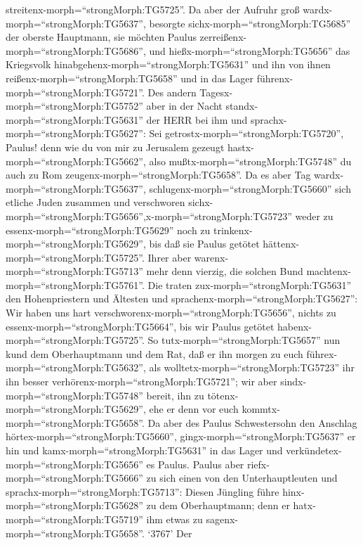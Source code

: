 streitenx-morph=``strongMorph:TG5725''.  Da aber der
Aufruhr groß wardx-morph=``strongMorph:TG5637'', besorgte
sichx-morph=``strongMorph:TG5685'' der oberste Hauptmann, sie möchten
Paulus zerreißenx-morph=``strongMorph:TG5686'', und
hießx-morph=``strongMorph:TG5656'' das Kriegsvolk
hinabgehenx-morph=``strongMorph:TG5631'' und ihn von ihnen
reißenx-morph=``strongMorph:TG5658'' und in das Lager
führenx-morph=``strongMorph:TG5721''.  Des andern
Tagesx-morph=``strongMorph:TG5752'' aber in der Nacht
standx-morph=``strongMorph:TG5631'' der HERR bei ihm und
sprachx-morph=``strongMorph:TG5627'': Sei
getrostx-morph=``strongMorph:TG5720'', Paulus! denn wie du von mir zu
Jerusalem gezeugt hastx-morph=``strongMorph:TG5662'', also
mußtx-morph=``strongMorph:TG5748'' du auch zu Rom
zeugenx-morph=``strongMorph:TG5658''.  Da es aber Tag
wardx-morph=``strongMorph:TG5637'',
schlugenx-morph=``strongMorph:TG5660'' sich etliche Juden zusammen und
verschworen
sichx-morph=``strongMorph:TG5656'',x-morph=``strongMorph:TG5723'' weder
zu essenx-morph=``strongMorph:TG5629'' noch zu
trinkenx-morph=``strongMorph:TG5629'', bis daß sie Paulus getötet
hättenx-morph=``strongMorph:TG5725''.  Ihrer aber
warenx-morph=``strongMorph:TG5713'' mehr denn vierzig, die solchen Bund
machtenx-morph=``strongMorph:TG5761''.  Die traten
zux-morph=``strongMorph:TG5631'' den Hohenpriestern und Ältesten und
sprachenx-morph=``strongMorph:TG5627'': Wir haben uns hart
verschworenx-morph=``strongMorph:TG5656'', nichts zu
essenx-morph=``strongMorph:TG5664'', bis wir Paulus getötet
habenx-morph=``strongMorph:TG5725''.  So
tutx-morph=``strongMorph:TG5657'' nun kund dem Oberhauptmann und dem
Rat, daß er ihn morgen zu euch führex-morph=``strongMorph:TG5632'', als
wolltetx-morph=``strongMorph:TG5723'' ihr ihn besser
verhörenx-morph=``strongMorph:TG5721''; wir aber
sindx-morph=``strongMorph:TG5748'' bereit, ihn zu
tötenx-morph=``strongMorph:TG5629'', ehe er denn vor euch
kommtx-morph=``strongMorph:TG5658''.  Da aber des Paulus
Schwestersohn den Anschlag hörtex-morph=``strongMorph:TG5660'',
gingx-morph=``strongMorph:TG5637'' er hin und
kamx-morph=``strongMorph:TG5631'' in das Lager und
verkündetex-morph=``strongMorph:TG5656'' es Paulus.  Paulus
aber riefx-morph=``strongMorph:TG5666'' zu sich einen von den
Unterhauptleuten und sprachx-morph=``strongMorph:TG5713'': Diesen
Jüngling führe hinx-morph=``strongMorph:TG5628'' zu dem Oberhauptmann;
denn er hatx-morph=``strongMorph:TG5719'' ihm etwas zu
sagenx-morph=``strongMorph:TG5658''.  `3767' Der
